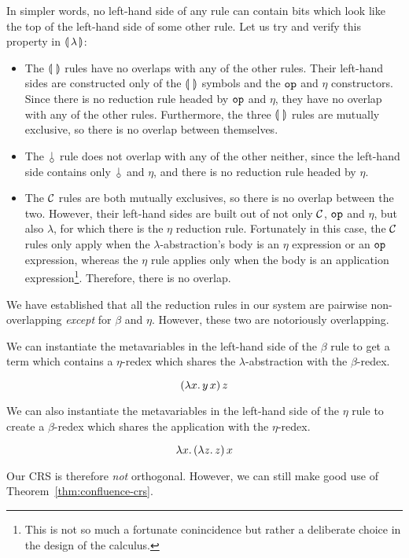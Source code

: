 In simpler words, no left-hand side of any rule can contain bits which look
like the top of the left-hand side of some other rule. Let us try and
verify this property in $\llparenthesis \, \lambda \, \rrparenthesis$:
\begin{itemize}
\item The $\llparenthesis \,  \, \rrparenthesis$ rules have no overlaps with any of the other
  rules. Their left-hand sides are constructed only of the $\llparenthesis \,  \, \rrparenthesis$
  symbols and the $\mathtt{op}$ and $\eta$ constructors. Since there is no
  reduction rule headed by $\mathtt{op}$ and $\eta$, they have no overlap with
  any of the other rules. Furthermore, the three $\llparenthesis \,  \, \rrparenthesis$ rules are
  mutually exclusive, so there is no overlap between themselves.
\item The $\cherry$ rule does not overlap with any of the other neither,
  since the left-hand side contains only $\cherry$ and $\eta$, and there is
  no reduction rule headed by $\eta$.
\item The $\mathcal{C}$ rules are both mutually exclusives, so there is no overlap
  between the two. However, their left-hand sides are built out of not only
  $\mathcal{C}$, $\mathtt{op}$ and $\eta$, but also $\lambda$, for which there is the
  $\eta$ reduction rule. Fortunately in this case, the $\mathcal{C}$ rules only
  apply when the $\lambda$-abstraction's body is an $\eta$ expression or an
  $\mathtt{op}$ expression, whereas the $\eta$ rule applies only when the
  body is an application expression\footnote{This is not so much a
    fortunate conincidence but rather a deliberate choice in the design of
    the calculus.}. Therefore, there is no overlap.
\end{itemize}

We have established that all the reduction rules in our system are pairwise
non-overlapping \emph{except} for $\beta$ and $\eta$. However,
these two are notoriously overlapping.

We can instantiate the metavariables in the left-hand side of the
$\beta$ rule to get a term which contains a $\eta$-redex which shares
the $\lambda$-abstraction with the $\beta$-redex.

$$
(\lambda x.\, y\,x)\,z
$$

We can also instantiate the metavariables in the left-hand side of the
$\eta$ rule to create a $\beta$-redex which shares the application with
the $\eta$-redex.

$$
\lambda x.\, (\lambda z.\, z)\,x
$$

Our CRS is therefore \emph{not} orthogonal. However, we can still make good
use of Theorem~\ref{thm:confluence-crs}.

